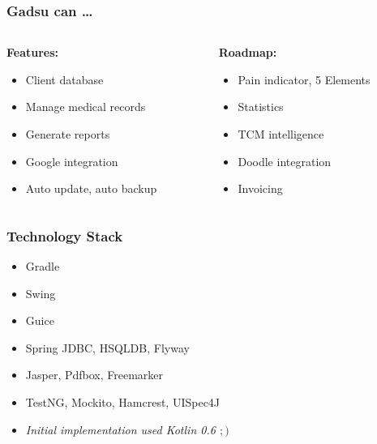 
\begin{frame}[t]
\frametitle{Gadsu can \ldots}
\begin{columns}[t]
\begin{column}{0.5\textwidth}
	\textbf{Features:}
	\begin{itemize}
		\item Client database
		\item Manage medical records
		\item Generate reports
		\item Google integration
		\item Auto update, auto backup
	\end{itemize}
\end{column}
\pause
\begin{column}{0.5\textwidth} 
	\textbf{Roadmap:}
	\begin{itemize}
		\item Pain indicator, 5 Elements
		\item Statistics
		\item TCM intelligence
		\item Doodle integration
		\item Invoicing
	\end{itemize}
\end{column}
\end{columns}
\end{frame}

\begin{frame}
\frametitle{Technology Stack}
\begin{itemize}[<+->]
	\item Gradle
	\item Swing
	\item Guice
	\item Spring JDBC, HSQLDB, Flyway
	\item Jasper, Pdfbox, Freemarker
	\item TestNG, Mockito, Hamcrest, UISpec4J
	\item \textit{Initial implementation used Kotlin 0.6 $;)$}
\end{itemize}
\end{frame}





